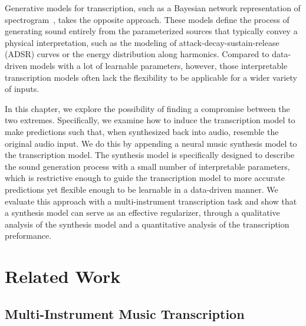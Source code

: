 Generative models for transcription, such as a Bayesian network representation of spectrogram~\cite{bergkirkpatrick2014unsupervised}, takes the opposite approach.
These models define the process of generating sound entirely from the parameterized sources that typically convey a physical interpretation, such as the modeling of attack-decay-sustain-release (ADSR) curves or the energy distribution along harmonics. 
Compared to data-driven models with a lot of learnable parameters, however, those interpretable transcription models often lack the flexibility to be applicable for a wider variety of inputs.

In this chapter, we explore the possibility of finding a compromise between the two extremes.
Specifically, we examine how to induce the transcription model to make predictions such that, when synthesized back into audio, resemble the original audio input.
We do this by appending a neural music synthesis model to the transcription model.
The synthesis model is specifically designed to describe the sound generation process with a small number of interpretable parameters, which is restrictive enough to guide the transcription model to more accurate predictions yet flexible enough to be learnable in a data-driven manner.
We evaluate this approach with a multi-instrument transcription task and show that a synthesis model can serve as an effective regularizer, through a qualitative analysis of the synthesis model and a quantitative analysis of the transcription preformance.

\section{Related Work}


\subsection{Multi-Instrument Music Transcription}

